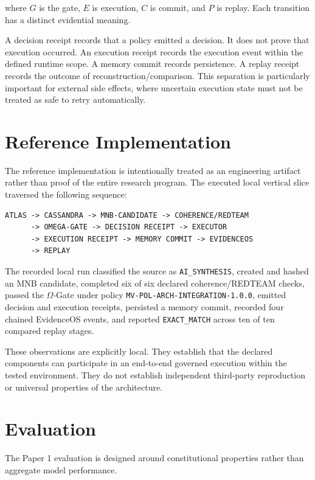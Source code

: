 \documentclass[11pt]{article}
\begin{document}
where $G$ is the gate, $E$ is execution, $C$ is commit, and $P$ is replay. Each transition has a distinct evidential meaning.

A decision receipt records that a policy emitted a decision. It does not prove that execution occurred. An execution receipt records the execution event within the defined runtime scope. A memory commit records persistence. A replay receipt records the outcome of reconstruction/comparison. This separation is particularly important for external side effects, where uncertain execution state must not be treated as safe to retry automatically.

\section{Reference Implementation}

The reference implementation is intentionally treated as an engineering artifact rather than proof of the entire research program. The executed local vertical slice traversed the following sequence:

\begin{verbatim}
ATLAS -> CASSANDRA -> MNB-CANDIDATE -> COHERENCE/REDTEAM
      -> OMEGA-GATE -> DECISION RECEIPT -> EXECUTOR
      -> EXECUTION RECEIPT -> MEMORY COMMIT -> EVIDENCEOS
      -> REPLAY
\end{verbatim}

The recorded local run classified the source as \texttt{AI\_SYNTHESIS}, created and hashed an MNB candidate, completed six of six declared coherence/REDTEAM checks, passed the $\Omega$-Gate under policy \texttt{MV-POL-ARCH-INTEGRATION-1.0.0}, emitted decision and execution receipts, persisted a memory commit, recorded four chained EvidenceOS events, and reported \texttt{EXACT\_MATCH} across ten of ten compared replay stages.

These observations are explicitly local. They establish that the declared components can participate in an end-to-end governed execution within the tested environment. They do not establish independent third-party reproduction or universal properties of the architecture.

\section{Evaluation}

The Paper 1 evaluation is designed around constitutional properties rather than aggregate model performance.
\end{document}
